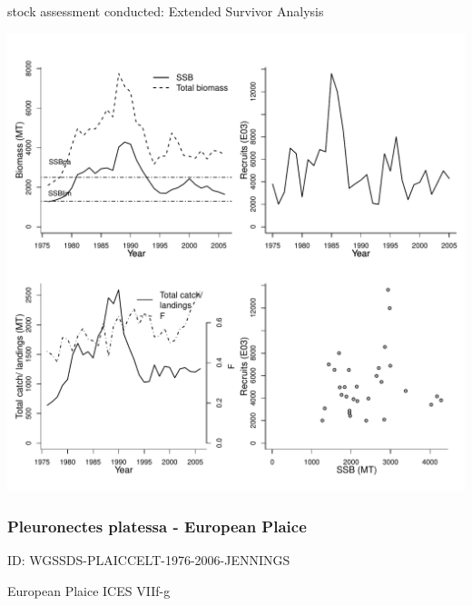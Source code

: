 stock assessment conducted: Extended Survivor Analysis 
\begin{center}
\vspace{-0.2cm}\includegraphics[scale=0.65]{../tex/figures/plot-WGSSDS-PLAICECHW-1975-2006-JENNINGS.pdf}
\end{center}

\newpage
\subsubsection{Pleuronectes platessa - European Plaice}
ID: WGSSDS-PLAICCELT-1976-2006-JENNINGS

European Plaice ICES VIIf-g 

